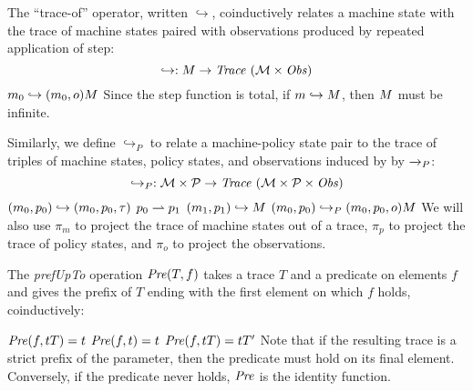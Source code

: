 \documentclass[acmsmall,review,anonymous]{acmart}\settopmatter{printfolios=true,printccs=false,printacmref=false}
\begin{document}
The ``trace-of'' operator, written \(\hookrightarrow\), coinductively
relates a machine state with the trace of machine states paired with
observations produced by repeated application of step:  
%
\[\hookrightarrow : M \rightarrow \mathit{Trace}~({\mathcal M} \times \mathit{Obs})\]%
%
            {\(m_0 \hookrightarrow (m_0,o) M\)}%
%
\noindent
Since the step function is total, if \(m \hookrightarrow M\),
then \(M\) must be infinite.


Similarly, we define \(\hookrightarrow_P\) to relate a machine-policy
state pair to the trace of triples of machine states, policy states,
and observations induced by by \(\xrightarrow{}_P\): 
%
\[\hookrightarrow_P : {\mathcal M} \times \mathcal{P} \rightarrow \mathit{Trace}~({\mathcal M} \times \mathcal{P} \times \mathit{Obs}) \]
%
         {\((m_0,p_0) \hookrightarrow (m_0,p_0,\tau)\)}
%
              {\(p_0 \rightharpoonup p_1\)}
              {\((m_1,p_1) \hookrightarrow M\)}
              {\((m_0,p_0) \hookrightarrow_P (m_0,p_0,o) M\)}
We will also use \(\pi_m\) to project the trace of machine states
out of a trace, \(\pi_p\) to project the trace of policy states, and
\(\pi_o\) to project the observations.  

The {\it prefUpTo} operation \(\mathit{Pre}(T,f)\) 
takes a trace \(T\) 
and a predicate on elements \(f\) and gives the prefix of \(T\)
ending with the first element on which \(f\) holds, coinductively:

         {\(\mathit{Pre}(f,tT) = t\)}
%
\judgment{}
         {\(\mathit{Pre}(f,t) = t\)}
%
            {\(\mathit{Pre}(f,tT) = tT'\)}
%
Note that if the resulting trace is a strict prefix of the parameter, then the
predicate must hold on its final element. Conversely, if the predicate never
holds, \(\mathit{Pre}\) is the identity function.
\end{document}
